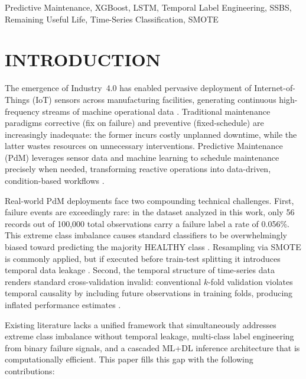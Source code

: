 \documentclass[conference]{IEEEtran}
\begin{document}
\begin{IEEEkeywords}
Predictive Maintenance, XGBoost, LSTM, Temporal Label Engineering, SSBS,
Remaining Useful Life, Time-Series Classification, SMOTE
\end{IEEEkeywords}

\section{INTRODUCTION}

The emergence of Industry~4.0 has enabled pervasive deployment of
Internet-of-Things (IoT) sensors across manufacturing facilities, generating
continuous high-frequency streams of machine operational data
\cite{lee2014industryiot}. Traditional maintenance paradigms corrective
(fix on failure) and preventive (fixed-schedule) are increasingly
inadequate: the former incurs costly unplanned downtime, while the latter
wastes resources on unnecessary interventions. Predictive Maintenance (PdM)
leverages sensor data and machine learning to schedule maintenance precisely
when needed, transforming reactive operations into data-driven,
condition-based workflows \cite{zhang2019pdmsurvey}.

Real-world PdM deployments face two compounding technical challenges. First,
failure events are exceedingly rare: in the dataset analyzed in this work,
only 56 records out of 100,000 total observations carry a failure label a
rate of 0.056\%. This extreme class imbalance causes standard classifiers to
be overwhelmingly biased toward predicting the majority HEALTHY class
\cite{chawla2002smote}. Resampling via SMOTE \cite{chawla2002smote} is
commonly applied, but if executed before train-test splitting it introduces
temporal data leakage \cite{kaufman2012leakage}. Second, the temporal
structure of time-series data renders standard cross-validation invalid:
conventional $k$-fold validation violates temporal causality by including
future observations in training folds, producing inflated performance
estimates \cite{bergmeir2018tscv}.

Existing literature \cite{li2025comparison, elkateb2024machine, bitam2025aiot} lacks a unified framework that simultaneously addresses
extreme class imbalance without temporal leakage, multi-class label
engineering from binary failure signals, and a cascaded ML+DL inference
architecture that is computationally efficient. This paper fills this gap with
the following contributions:
\end{document}
